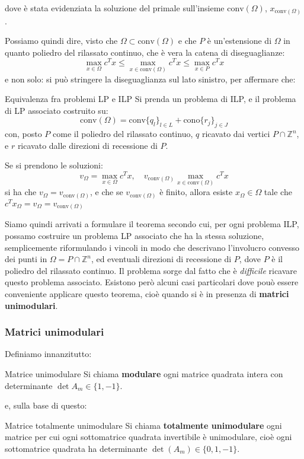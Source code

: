 \documentclass[a4paper,11pt]{article}
\begin{document}
dove è stata evidenziata la soluzione del primale sull'insieme $\mathrm{conv}(\Omega)$, $x_{\mathrm{conv}(\Omega)}$.

Possiamo quindi dire, visto che $\Omega \subset \mathrm{conv}(\Omega)$ e che $P$ è un'estensione di $\Omega$ in quanto poliedro del rilassato continuo, che è vera la catena di diseguaglianze:
$$
\max_{x \in \Omega} c^T x \leq \max_{x \in \mathrm{conv}(\Omega)} c^T x \leq \max_{x \in P} c^T x
$$
e non solo: si può stringere la diseguaglianza sul lato sinistro, per affermare che:
\begin{theorem}{Equivalenza fra problemi LP e ILP}
	Si prenda un problema di ILP, e il problema di LP associato costruito su:
$$
\mathrm{conv}(\Omega) = \mathrm{conv} \{ q_l \}_{l \in L} + \mathrm{cono} \{ r_j \}_{j \in J}
$$
con, posto $P$ come il poliedro del rilassato continuo, $q$ ricavato dai vertici $P \cap \mathbb{Z}^n$, e $r$ ricavato dalle direzioni di recessione di $P$. 

Se si prendono le soluzioni:
$$ v_\Omega = \max_{x \in \Omega} c^T x, \quad v_{\mathrm{conv}(\Omega)} \max_{x \in \mathrm{conv}(\Omega)} c^T x$$
si ha che $v_\Omega = v_{\mathrm{conv}(\Omega)}$, e che se $v_{\mathrm{conv}(\Omega)}$ è finito, allora esiste $x_\Omega \in \Omega$ tale che $c^T x_\Omega = v_\Omega = v_{\mathrm{conv}(\Omega)}$
\end{theorem}

Siamo quindi arrivati a formulare il teorema secondo cui, per ogni problema ILP, possamo costruire un problema LP associato che ha la stessa soluzione, semplicemente riformulando i vincoli in modo che descrivano l'involucro convesso dei punti in $\Omega = P \cap \mathbb{Z}^n$, ed eventuali direzioni di recessione di $P$, dove $P$ è il poliedro del rilassato continuo.
Il problema sorge dal fatto che è \textit{difficile} ricavare questo problema associato.
Esistono però alcuni casi particolari dove pouò essere conveniente applicare questo teorema, cioè quando si è in presenza di \textbf{matrici unimodulari}.

\subsubsection{Matrici unimodulari}
Definiamo innanzitutto:
\begin{definition}{Matrice unimodulare}
	Si chiama \textbf{modulare} ogni matrice quadrata intera con determinante $\det{A_{m}} \in \{ 1, -1\}$.
\end{definition}
e, sulla base di questo:
\begin{definition}{Matrice totalmente unimodulare}
	Si chiama \textbf{totalmente unimodulare} ogni matrice per cui ogni sottomatrice quadrata invertibile è unimodulare, cioè ogni sottomatrice quadrata ha determinante $\det(A_{m}) \in \{0, 1, -1\}$.
\end{definition}
\end{document}
